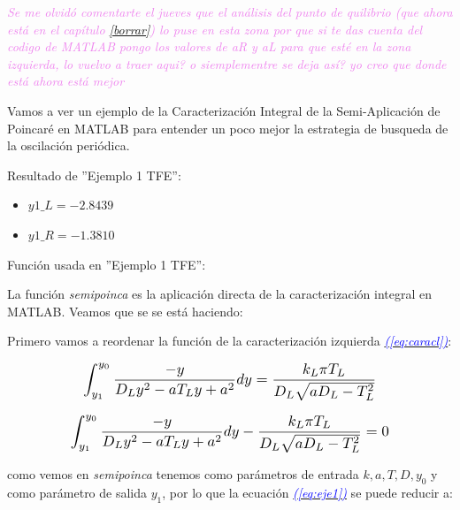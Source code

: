 \documentclass[12pt,a4paper]{report} %
\newcommand{\eref}[1]{\hyperref[#1]{\textcolor{blue}{\textit{(\ref*{#1})}}}}
\begin{document}
	\textit{\textcolor{violet}{Se me olvidó comentarte el jueves que el análisis del punto de quilibrio (que ahora está en el capítulo \ref{borrar}) lo puse en esta zona por que si te das cuenta del codigo de MATLAB pongo los valores de aR y aL para que esté en la zona izquierda, lo vuelvo a traer aqui? o siemplementre se deja así? yo creo que donde está ahora está mejor}}
	
	\vspace{0.5cm} Vamos a ver un ejemplo de la Caracterización Integral de la Semi-Aplicación de Poincaré en MATLAB para entender un poco mejor la estrategia de busqueda de la oscilación periódica.
	
	\vspace{1cm}
	
	\vspace{0.5cm}\noindent Resultado de ''Ejemplo 1 TFE'':
	\begin{itemize}
		\item $y1\_L=-2.8439$
		\item $y1\_R=-1.3810$
	\end{itemize}
	
	\vspace{1cm}\noindent Función usada en ''Ejemplo 1 TFE'':
	\vspace{0.5cm}
	
	\newpage
	
	La función \textit{semipoinca} es la aplicación directa de la caracterización integral en MATLAB. Veamos que se se está haciendo:
	
	\vspace{0.5cm}\noindent Primero vamos a reordenar la función de la caracterización izquierda \eref{eq:caracl}:
	
	\begin{equation}
			\label{eq:eje1}
		\scalebox{1.2}{$\displaystyle
		\begin{gathered}
			\int_{y_1}^{y_0}\frac{-y}{D_Ly^2-aT_Ly+a^2}dy=\frac{k_L\pi T_L}{D_L\sqrt{aD_L-T_L^2}} \\[2mm]
			\int_{y_1}^{y_0}\frac{-y}{D_Ly^2-aT_Ly+a^2}dy-\frac{k_L\pi T_L}{D_L\sqrt{aD_L-T_L^2}}=0
		\end{gathered}
			$}
	\end{equation}\smallskip
	
	\noindent como vemos en \textit{semipoinca} tenemos como parámetros de entrada $k,a,T,D,y_0$ y como parámetro de salida $y_1$, por lo que la ecuación \eref{eq:eje1} se puede reducir a:
	
\end{document}
